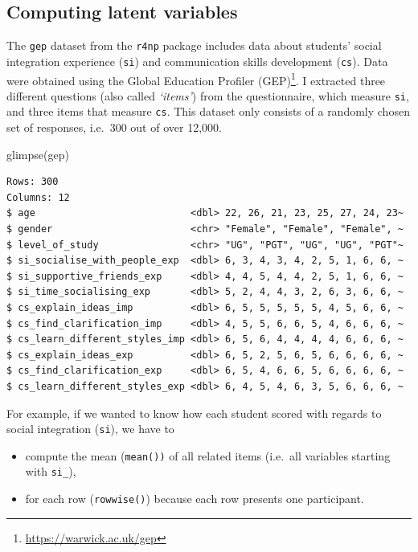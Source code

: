 \documentclass[
  letterpaper,
]{krantz}
\makeatletter
\newenvironment{Shaded}{\begin{snugshade}}{\end{snugshade}}
\newcommand{\FunctionTok}[1]{\textcolor[rgb]{0.28,0.35,0.67}{#1}}
\newcommand{\NormalTok}[1]{\textcolor[rgb]{0.00,0.23,0.31}{#1}}
\renewcommand{\href}[2]{#2\footnote{\url{#1}}}
\newenvironment{kframe}{%
\medskip{}
\setlength{\fboxsep}{.8em}
 \def\at@end@of@kframe{}%
 \ifinner\ifhmode%
  \def\at@end@of@kframe{\end{minipage}}%
  \begin{minipage}{\columnwidth}%
 \fi\fi%
 \def\FrameCommand##1{\hskip\@totalleftmargin \hskip-\fboxsep
 \colorbox{shadecolor}{##1}\hskip-\fboxsep
     \hskip-\linewidth \hskip-\@totalleftmargin \hskip\columnwidth}%
 \MakeFramed {\advance\hsize-\width
   \@totalleftmargin\z@ \linewidth\hsize
   \@setminipage}}%
 {\par\unskip\endMakeFramed%
 \at@end@of@kframe}
\renewenvironment{Shaded}{\begin{kframe}}{\end{kframe}}
\makeatother
\begin{document}
\subsection{Computing latent
variables}\label{sec-computing-latent-variables}

The \texttt{gep} dataset from the \texttt{r4np} package includes data
about students' social integration experience (\texttt{si}) and
communication skills development (\texttt{cs}). Data were obtained using
the \href{https://warwick.ac.uk/gep}{Global Education Profiler (GEP)}. I
extracted three different questions (also called \emph{`items'}) from
the questionnaire, which measure \texttt{si}, and three items that
measure \texttt{cs}. This dataset only consists of a randomly chosen set
of responses, i.e.~300 out of over 12,000.

\begin{Shaded}
\begin{Highlighting}[]
\FunctionTok{glimpse}\NormalTok{(gep)}
\end{Highlighting}
\end{Shaded}

\begin{verbatim}
Rows: 300
Columns: 12
$ age                           <dbl> 22, 26, 21, 23, 25, 27, 24, 23~
$ gender                        <chr> "Female", "Female", "Female", ~
$ level_of_study                <chr> "UG", "PGT", "UG", "UG", "PGT"~
$ si_socialise_with_people_exp  <dbl> 6, 3, 4, 3, 4, 2, 5, 1, 6, 6, ~
$ si_supportive_friends_exp     <dbl> 4, 4, 5, 4, 4, 2, 5, 1, 6, 6, ~
$ si_time_socialising_exp       <dbl> 5, 2, 4, 4, 3, 2, 6, 3, 6, 6, ~
$ cs_explain_ideas_imp          <dbl> 6, 5, 5, 5, 5, 5, 4, 5, 6, 6, ~
$ cs_find_clarification_imp     <dbl> 4, 5, 5, 6, 6, 5, 4, 6, 6, 6, ~
$ cs_learn_different_styles_imp <dbl> 6, 5, 6, 4, 4, 4, 4, 6, 6, 6, ~
$ cs_explain_ideas_exp          <dbl> 6, 5, 2, 5, 6, 5, 6, 6, 6, 6, ~
$ cs_find_clarification_exp     <dbl> 6, 5, 4, 6, 6, 5, 6, 6, 6, 6, ~
$ cs_learn_different_styles_exp <dbl> 6, 4, 5, 4, 6, 3, 5, 6, 6, 6, ~
\end{verbatim}

For example, if we wanted to know how each student scored with regards
to social integration (\texttt{si}), we have to

\begin{itemize}
\item
  compute the mean (\texttt{mean())} of all related items (i.e.~all
  variables starting with \texttt{si\_}),
\item
  for each row (\texttt{rowwise()}) because each row presents one
  participant.
\end{itemize}
\end{document}
